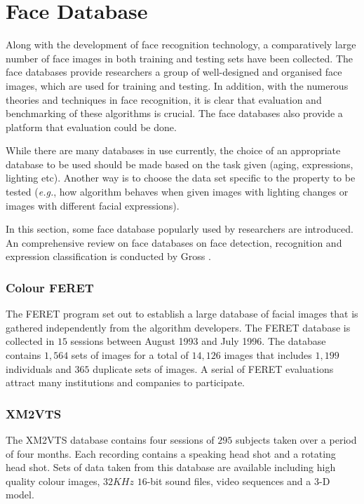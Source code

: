 \section{Face Database}\label{sec:facedatabase}
Along with the development of face recognition technology, a comparatively large number of face images in both training and testing sets have been collected. The face databases provide researchers a group of well-designed and organised face images, which are used for training and testing. In addition, with the numerous theories and techniques in face recognition, it is clear that evaluation and benchmarking of these algorithms is crucial. The face databases also provide a platform that evaluation could be done.

While there are many databases in use currently, the choice of an appropriate database to be used should be made based on the task given (aging, expressions, lighting etc). Another way is to choose the data set specific to the property to be tested (\textit{e.g.}, how algorithm behaves when given images with lighting changes or images with different facial expressions).

In this section, some face database popularly used by researchers are introduced. An comprehensive review on face databases on face detection, recognition and expression classification is conducted by Gross \cite{Gross2005}.

\subsubsection{Colour FERET}
The FERET \cite{Phillips1996} program set out to establish a large database of facial images that is gathered independently from the algorithm developers. The FERET database is collected in $15$ sessions between August 1993 and July 1996. The database contains $1,564$ sets of images for a total of $14,126$ images that includes $1,199$ individuals and $365$ duplicate sets of images.
A serial of FERET evaluations attract many institutions and companies to participate.
\subsubsection{XM2VTS}
The XM2VTS database \cite{Messer1999} contains four sessions of $295$ subjects taken over a period of four months. Each recording contains a speaking head shot and a rotating head shot. Sets of data taken from this database are available including high quality colour images, $32 KHz$ $16$-bit sound files, video sequences and a 3-D model.
